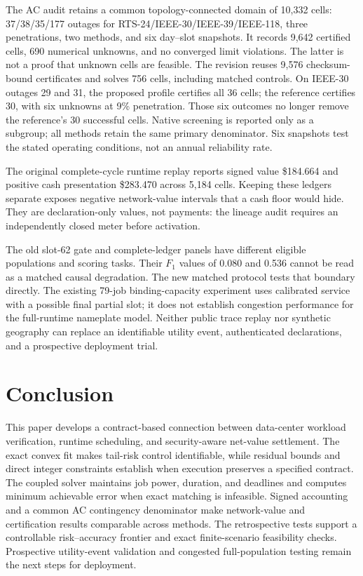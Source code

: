 \documentclass[10pt,journal]{IEEEtran}
\begin{document}
The AC audit retains a common topology-connected domain of 10,332 cells:
37/38/35/177 outages for RTS-24/IEEE-30/IEEE-39/IEEE-118, three penetrations,
two methods, and six day--slot snapshots. It records 9,642 certified cells,
690 numerical unknowns, and no converged limit violations. The latter is
not a proof that unknown cells are feasible. The revision reuses 9,576
checksum-bound certificates and solves 756 cells, including matched controls.
On IEEE-30 outages 29 and 31, the proposed profile certifies all 36 cells;
the reference certifies 30, with six unknowns at 9\% penetration. Those six
outcomes no longer remove the reference's 30 successful cells. Native
screening is reported only as a subgroup; all methods retain the same primary
denominator. Six snapshots test the stated operating conditions, not an
annual reliability rate.

The original complete-cycle runtime replay reports signed value \$184.664 and
positive cash presentation \$283.470 across 5,184 cells. Keeping these ledgers
separate exposes negative network-value intervals that a cash floor would
hide. They are declaration-only values, not payments: the lineage audit
requires an independently closed meter before activation.

The old slot-62 gate and complete-ledger panels have different eligible
populations and scoring tasks. Their $F_1$ values of 0.080 and 0.536 cannot
be read as a matched causal degradation. The new matched protocol tests that
boundary directly. The existing 79-job binding-capacity experiment uses
calibrated service with a possible final partial slot; it does not establish
congestion performance for the full-runtime nameplate model. Neither public
trace replay nor synthetic geography can replace an identifiable utility
event, authenticated declarations, and a prospective deployment trial.

\section{Conclusion}\label{sec:conclusion}

This paper develops a contract-based connection between data-center workload
verification, runtime scheduling, and security-aware net-value settlement.
The exact convex fit makes tail-risk control identifiable, while residual
bounds and direct integer constraints establish when execution preserves a
specified contract. The coupled solver maintains job power, duration, and
deadlines and computes minimum achievable error when exact matching is
infeasible. Signed accounting and a common AC contingency denominator make
network-value and certification results comparable across methods. The
retrospective tests support a controllable risk--accuracy frontier and exact
finite-scenario feasibility checks. Prospective utility-event validation and
congested full-population testing remain the next steps for deployment.



\end{document}
